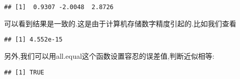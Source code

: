 \documentclass[]{ctexbook}
\newenvironment{Shaded}{\begin{snugshade}}{\end{snugshade}}
\newcommand{\DataTypeTok}[1]{\textcolor[rgb]{0.13,0.29,0.53}{#1}}
\newcommand{\DecValTok}[1]{\textcolor[rgb]{0.00,0.00,0.81}{#1}}
\newcommand{\FloatTok}[1]{\textcolor[rgb]{0.00,0.00,0.81}{#1}}
\newcommand{\KeywordTok}[1]{\textcolor[rgb]{0.13,0.29,0.53}{\textbf{#1}}}
\newcommand{\NormalTok}[1]{#1}
\newcommand{\OperatorTok}[1]{\textcolor[rgb]{0.81,0.36,0.00}{\textbf{#1}}}
\begin{document}
\begin{verbatim}
## [1]  0.9307 -2.0048  2.8726
\end{verbatim}

可以看到结果是一致的.这是由于计算机存储数字精度引起的.比如我们查看

\begin{Shaded}
\end{Shaded}

\begin{verbatim}
## [1] 4.552e-15
\end{verbatim}

另外,我们可以用all.equal这个函数设置容忍的误差值,判断近似相等:

\begin{Shaded}
\end{Shaded}

\begin{verbatim}
## [1] TRUE
\end{verbatim}
\end{document}

